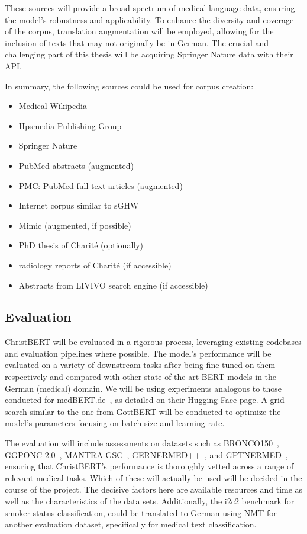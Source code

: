 These sources will provide a broad spectrum of medical language data, ensuring
the model's robustness and applicability. To enhance the diversity and coverage
of the corpus, translation augmentation will be employed, allowing for the
inclusion of texts that may not originally be in German. The crucial and
challenging part of this thesis will be acquiring Springer Nature data with
their API.

In summary, the following sources could be used for corpus creation:

\begin{itemize}
    \item Medical Wikipedia
    \item Hpsmedia Publishing Group
    \item Springer Nature
    \item PubMed abstracts (augmented)
    \item PMC: PubMed full text articles (augmented)
    \item Internet corpus similar to sGHW~\cite{zowalla2020crawling}
    \item Mimic (augmented, if possible)
    \item PhD thesis of Charité (optionally)
    \item radiology reports of Charité (if accessible)
    \item Abstracts from LIVIVO search engine (if accessible)
\end{itemize}

\subsection*{Evaluation}

ChristBERT will be evaluated in a rigorous process, leveraging existing
codebases and evaluation pipelines where possible. The model's performance will
be evaluated on a variety of downstream tasks after being fine-tuned on them
respectively and compared with other state-of-the-art BERT models in the German
(medical) domain. We will be using experiments analogous to those conducted for
medBERT.de~\cite{bressem2024medbert}, as detailed on their Hugging Face page. A
grid search similar to the one from GottBERT will be conducted to optimize the
model's parameters focusing on batch size and learning rate. 

The evaluation will include assessments on datasets such as
BRONCO150~\cite{kittner2021bronco150}, GGPONC 2.0~\cite{borchert2022ggponc},
MANTRA GSC~\cite{kors2015mantragsc}, GERNERMED++~\cite{frei2022gernermed}, and
GPTNERMED~\cite{frei2023gptnermed}, ensuring that ChristBERT's performance is
thoroughly vetted across a range of relevant medical tasks. Which of these will
actually be used will be decided in the course of the project. The decisive
factors here are available resources and time as well as the characteristics of
the data sets. Additionally, the i2c2 benchmark for smoker status
classification, could be translated to German using NMT for another evaluation
dataset, specifically for medical text classification.

